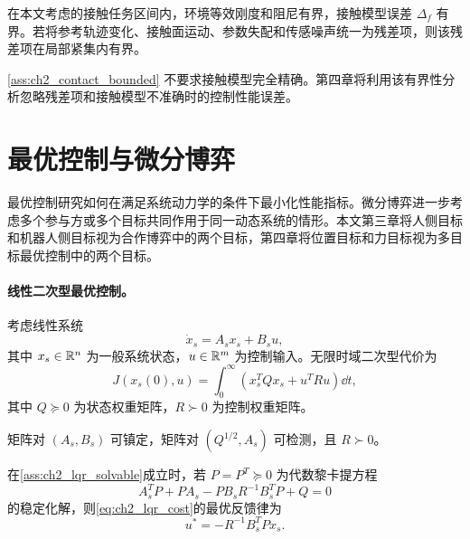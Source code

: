 \begin{assumption}[接触模型的局部有界性]
\label{ass:ch2_contact_bounded}
在本文考虑的接触任务区间内，环境等效刚度和阻尼有界，接触模型误差 $\Delta_f$ 有界。若将参考轨迹变化、接触面运动、参数失配和传感噪声统一为残差项，则该残差项在局部紧集内有界。
\end{assumption}

\begin{remark}
\cref{ass:ch2_contact_bounded} 不要求接触模型完全精确。第四章将利用该有界性分析忽略残差项和接触模型不准确时的控制性能误差。
\end{remark}

\section{最优控制与微分博弈}
\label{sec:ch2_optimal_game}

最优控制研究如何在满足系统动力学的条件下最小化性能指标。微分博弈进一步考虑多个参与方或多个目标共同作用于同一动态系统的情形。本文第三章将人侧目标和机器人侧目标视为合作博弈中的两个目标，第四章将位置目标和力目标视为多目标最优控制中的两个目标。

\paragraph{线性二次型最优控制。}
\label{subsec:ch2_lqr}

考虑线性系统
\begin{equation}
  \dot x_s=A_sx_s+B_su,
  \label{eq:ch2_lqr_system}
\end{equation}
其中 $x_s\in\mathbb{R}^n$ 为一般系统状态，$u\in\mathbb{R}^m$ 为控制输入。无限时域二次型代价为
\begin{equation}
  J(x_s(0),u)=\int_0^\infty\left(x_s^TQx_s+u^TRu\right)\dd t,
  \label{eq:ch2_lqr_cost}
\end{equation}
其中 $Q\succeq0$ 为状态权重矩阵，$R\succ0$ 为控制权重矩阵。

\begin{assumption}[线性二次型问题的可解性]
\label{ass:ch2_lqr_solvable}
矩阵对 $(A_s,B_s)$ 可镇定，矩阵对 $(Q^{1/2},A_s)$ 可检测，且 $R\succ0$。
\end{assumption}

\begin{lemma}[线性二次型最优反馈律]
\label{lem:ch2_lqr}
在\cref{ass:ch2_lqr_solvable}成立时，若 $P=P^T\succeq0$ 为代数黎卡提方程
\begin{equation}
  A_s^TP+PA_s-PB_sR^{-1}B_s^TP+Q=0
  \label{eq:ch2_are}
\end{equation}
的稳定化解，则\eqref{eq:ch2_lqr_cost}的最优反馈律为
\begin{equation}
  u^*=-R^{-1}B_s^TPx_s .
  \label{eq:ch2_lqr_law}
\end{equation}
\end{lemma}

